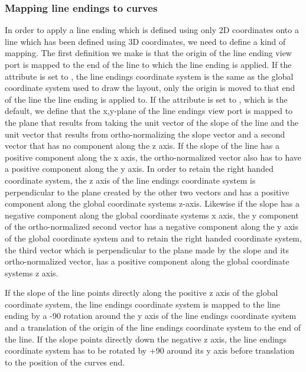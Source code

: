 \subsubsection{Mapping line endings to curves}

In order to apply a line ending which is defined using only 2D coordinates onto a line which
has been defined using 3D coordinates, we need to define a kind of mapping.
The first definition we make is that the origin of the line ending view port is
mapped to the end of the line to which the line ending is applied.
If the  attribute is set to , the
line endings coordinate system is the same as the global coordinate system used to draw the layout,
only the origin is moved to that end of the line the line ending is applied to. If
the  attribute is set to , which is
the default, we define that the x,y-plane of the line endings view port is mapped to the
plane that results from taking the unit vector of the slope of the line and the unit
vector that results from ortho-normalizing the slope vector and a second vector
that has no component along the z axis. If the slope of the line has a positive component along the x axis,
the ortho-normalized vector also has to have a positive component along the y axis. In order to retain the
right handed coordinate system, the z axis of the line endings coordinate system is perpendicular to the plane created by the other two vectors and has a positive component along the global coordinate systems z-axis.
Likewise if the slope has a negative component along the global coordinate systems x axis, the y component of the
ortho-normalized second vector has a negative component along the y axis of the global coordinate system and to 
retain the right handed coordinate system, the third vector which is perpendicular to the plane made by the slope
and its ortho-normalized vector, has a positive component along the global coordinate systems z axis. 

If the slope of the line points directly along the positive z axis of the global coordinate system, the 
line endings coordinate system is mapped to the line ending by a -90 rotation around the y axis of the 
line endings coordinate system and a translation of the origin of the line endings coordinate system to 
the end of the line. If the slope points directly down the negative z axis, the line endings coordinate 
system has to be rotated by +90 around its y axis before translation to the position of the curves end.   

